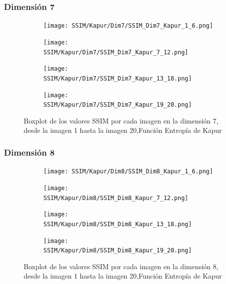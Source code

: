 \documentclass[conference]{IEEEtran}
\begin{document}
\subsubsection{Dimensión 7}
\begin{figure}
	\centering
	
	\begin{subfigure}{0.4\textwidth}
		\texttt{[image: SSIM/Kapur/Dim7/SSIM\_Dim7\_Kapur\_1\_6.png]}
	\end{subfigure}
	
	\begin{subfigure}{0.4\textwidth}
		\texttt{[image: SSIM/Kapur/Dim7/SSIM\_Dim7\_Kapur\_7\_12.png]}
	\end{subfigure}
	\begin{subfigure}{0.4\textwidth}
		\texttt{[image: SSIM/Kapur/Dim7/SSIM\_Dim7\_Kapur\_13\_18.png]}
	\end{subfigure}   
	\begin{subfigure}{0.4\textwidth}
		\texttt{[image: SSIM/Kapur/Dim7/SSIM\_Dim7\_Kapur\_19\_20.png]}
		\vspace{-120pt} %
	\end{subfigure}
	\caption{Boxplot de los valores SSIM por cada imagen en la dimensión 7, desde la imagen 1 hasta la imagen 20,Función Entropía de Kapur}
	\label{fig:imagenes}    
\end{figure}

\subsubsection{Dimensión 8}
\begin{figure}
	\centering
	
	\begin{subfigure}{0.4\textwidth}
		\texttt{[image: SSIM/Kapur/Dim8/SSIM\_Dim8\_Kapur\_1\_6.png]}
	\end{subfigure}
	
	\begin{subfigure}{0.4\textwidth}
		\texttt{[image: SSIM/Kapur/Dim8/SSIM\_Dim8\_Kapur\_7\_12.png]}
	\end{subfigure}  
	\begin{subfigure}{0.4\textwidth}
		\texttt{[image: SSIM/Kapur/Dim8/SSIM\_Dim8\_Kapur\_13\_18.png]}
	\end{subfigure}   
	\begin{subfigure}{0.4\textwidth}
		\texttt{[image: SSIM/Kapur/Dim8/SSIM\_Dim8\_Kapur\_19\_20.png]}
		\vspace{-120pt} %
	\end{subfigure}
	\caption{Boxplot de los valores SSIM por cada imagen en la dimensión 8, desde la imagen 1 hasta la imagen 20,Función Entropía de Kapur}
	\label{fig:imagenes}    
\end{figure}
\end{document}
